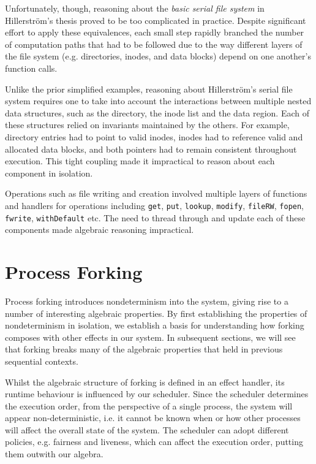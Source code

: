 \documentclass[logo,bsc,singlespacing,parskip]{infthesis}
\begin{document}
Unfortunately, though, reasoning about the \textit{basic serial file system} in Hillerström's thesis proved to be too complicated in practice. Despite significant effort to apply these equivalences, each small step  rapidly branched the number of computation paths that had to be followed due to the way different layers of the file system (e.g. directories, inodes, and data blocks) depend on one another's function calls. 

Unlike the prior simplified examples, reasoning about Hillerström's serial file system requires one to take into account the interactions between multiple nested data structures, such as the directory, the inode list and the data region. Each of these structures relied on invariants maintained by the others. For example, directory entries had to point to valid inodes, inodes had to reference valid and allocated data blocks, and both pointers had to remain consistent throughout execution. This tight coupling made it impractical to reason about each component in isolation.

Operations such as file writing and creation involved multiple layers of functions and handlers for operations including \lstinline{get}, \lstinline{put}, \lstinline{lookup}, \lstinline{modify}, \lstinline{fileRW}, \lstinline{fopen}, \lstinline{fwrite}, \lstinline{withDefault} etc. The need to thread through and update each of these components made algebraic reasoning impractical.


\section{Process Forking}
Process forking introduces nondeterminism into the system, giving rise to a number of interesting algebraic properties. By first establishing the properties of nondeterminism in isolation, we establish a basis for understanding how forking composes with other effects in our system. In subsequent sections, we will see that forking breaks many of the algebraic properties that held in previous sequential contexts.

Whilst the algebraic structure of forking is defined in an effect handler, its runtime behaviour is influenced by our scheduler. Since the scheduler determines the execution order, from the perspective of a single process, the system will appear non-deterministic, i.e. it cannot be known when or how other processes will affect the overall state of the system. The scheduler can adopt different policies, e.g. fairness and liveness, which can affect the execution order, putting them outwith our algebra.
\end{document}
